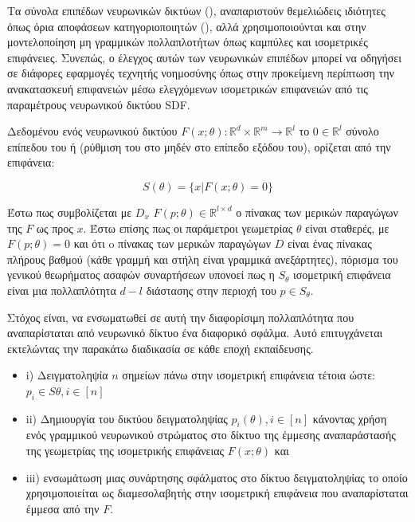 Τα σύνολα επιπέδων νευρωνικών δικτύων (), αναπαριστούν θεμελιώδεις ιδιότητες όπως όρια αποφάσεων κατηγοριοποιητών (), αλλά χρησιμοποιούνται και στην μοντελοποίηση μη γραμμικών πολλαπλοτήτων όπως καμπύλες και ισομετρικές επιφάνειες. Συνεπώς, ο έλεγχος αυτών των νευρωνικών επιπέδων μπορεί να οδηγήσει σε διάφορες εφαρμογές τεχνητής νοημοσύνης όπως στην προκείμενη περίπτωση την ανακατασκευή  επιφανειών μέσω ελεγχόμενων ισομετρικών επιφανειών από τις παραμέτρους νευρωνικού δικτύου SDF.


Δεδομένου ενός νευρωνικού δικτύου $F(x;\theta): \mathbb{R}^d\times\mathbb{R}^m\rightarrow\mathbb{R}^l$ το $0 \in \mathbb{R}^l$  σύνολο επίπεδου του ή (ρύθμιση του στο μηδέν στο επίπεδο εξόδου του), ορίζεται από την επιφάνεια:

$$ S(\theta) = \{x  | F(x;\theta) = 0 \}$$

Έστω πως συμβολίζεται με $D_{x}$ $F(p;\theta)\in\mathbb{R}^{l \times d}$   ο πίνακας των μερικών παραγώγων της $F$ ως προς $x$. Έστω επίσης πως οι παράμετροι γεωμετρίας $\theta$ είναι σταθερές, με $F(p;\theta) = 0$ και ότι o πίνακας των μερικών παραγώγων $D$ είναι ένας πίνακας πλήρους βαθμού (κάθε γραμμή και στήλη είναι γραμμικά ανεξάρτητες), πόρισμα του γενικού θεωρήματος ασαφών συναρτήσεων υπονοεί πως η  $S_\theta$ ισομετρική επιφάνεια είναι μια πολλαπλότητα $d-l$  διάστασης στην περιοχή του $p\in S_\theta$.

Στόχος είναι, να ενσωματωθεί σε αυτή την διαφορίσιμη πολλαπλότητα που αναπαρίσταται από νευρωνικό δίκτυο ένα διαφορικό σφάλμα. 
Αυτό επιτυγχάνεται εκτελώντας την παρακάτω διαδικασία σε κάθε εποχή εκπαίδευσης. \\
\begin{itemize}
    \item i) Δειγματοληψία $n$ σημείων πάνω στην ισομετρική επιφάνεια τέτοια ώστε: $p_i \in S\theta, i \in [n]$
    \item ii) Δημιουργία του δικτύου δειγματοληψίας $p_i(\theta), i \in [n]$ κάνοντας χρήση ενός γραμμικού νευρωνικού στρώματος στο δίκτυο της έμμεσης αναπαράστασής της γεωμετρίας της ισομετρικής επιφάνειας $F(x;\theta)$  και 
    \item iii) ενσωμάτωση μιας συνάρτησης σφάλματος στο δίκτυο δειγματοληψίας το οποίο χρησιμοποιείται ως διαμεσολαβητής στην ισομετρική επιφάνεια που αναπαρίσταται έμμεσα από την $F$.
\end{itemize} 
